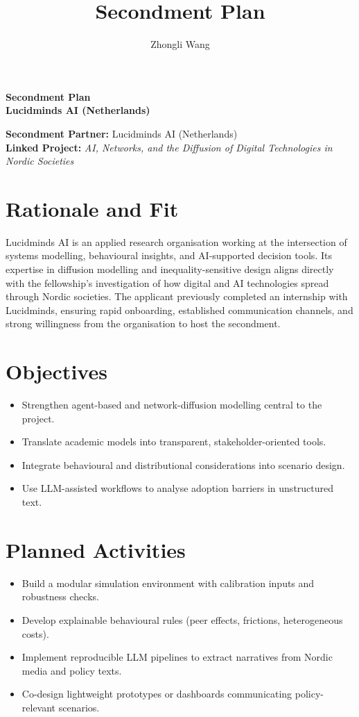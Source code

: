 \documentclass{nfr}
\title{Secondment Plan}
\author{Zhongli Wang}
\begin{document}
\begin{center}
{\Large \textbf{Secondment Plan}}\\[0.4cm]
{\large \textbf{Lucidminds AI (Netherlands)}}\\[0.2cm]
\end{center}

\noindent \textbf{Secondment Partner:} Lucidminds AI (Netherlands)\\
\textbf{Linked Project:} \emph{AI, Networks, and the Diffusion of Digital Technologies in Nordic Societies}\\[0.4cm]

\section*{Rationale and Fit}

Lucidminds AI is an applied research organisation working at the intersection of systems modelling, behavioural insights, and AI-supported decision tools. Its expertise in diffusion modelling and inequality-sensitive design aligns directly with the fellowship’s investigation of how digital and AI technologies spread through Nordic societies.  
The applicant previously completed an internship with Lucidminds, ensuring rapid onboarding, established communication channels, and strong willingness from the organisation to host the secondment.

\section*{Objectives}

\begin{itemize}
\item Strengthen agent-based and network-diffusion modelling central to the project.
\item Translate academic models into transparent, stakeholder-oriented tools.
\item Integrate behavioural and distributional considerations into scenario design.
\item Use LLM-assisted workflows to analyse adoption barriers in unstructured text.
\end{itemize}

\section*{Planned Activities}

\begin{itemize}
\item Build a modular simulation environment with calibration inputs and robustness checks.
\item Develop explainable behavioural rules (peer effects, frictions, heterogeneous costs).
\item Implement reproducible LLM pipelines to extract narratives from Nordic media and policy texts.
\item Co-design lightweight prototypes or dashboards communicating policy-relevant scenarios.
\end{itemize}
\end{document}
